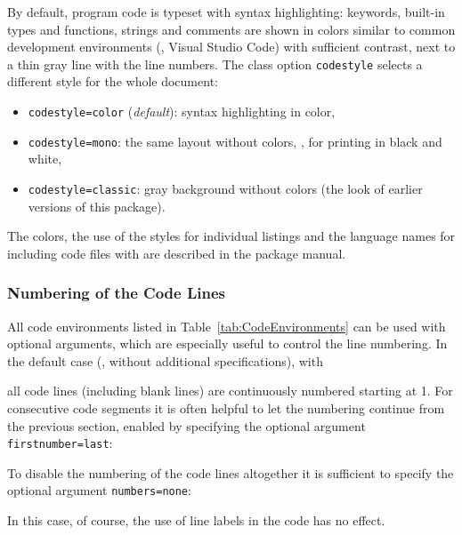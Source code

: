 By default, program code is typeset with syntax highlighting: keywords,
built-in types and functions, strings and comments are shown in colors similar
to common development environments (\eg, Visual Studio Code) with sufficient
contrast, next to a thin gray line with the line numbers. The class option
\texttt{codestyle} selects a different style for the whole document:
%
\begin{itemize}
	\item[] \texttt{codestyle=color} (\emph{default}): syntax highlighting in color,
	\item[] \texttt{codestyle=mono}: the same layout without colors, \eg, for
		printing in black and white,
	\item[] \texttt{codestyle=classic}: gray background without colors (the look
		of earlier versions of this package).
\end{itemize}
%
The colors, the use of the styles for individual listings and the language
names for including code files with \verb!! are described in
the package manual.


\subsubsection{Numbering of the Code Lines}

All code environments listed in Table~\ref{tab:CodeEnvironments} can be used
with optional arguments, which are especially useful to control the line
numbering. In the default case (\ie, without additional specifications), with
%
%
all code lines (including blank lines) are continuously numbered starting at
1. For consecutive code segments it is often helpful to let the numbering
continue from the previous section, enabled by specifying the optional argument
\texttt{firstnumber={\obnh}last}:
%
%
To disable the numbering of the code lines altogether it is sufficient to
specify the optional argument
\texttt{numbers={\obnh}none}:
%
%
In this case, of course, the use of line labels in the code has no effect.


